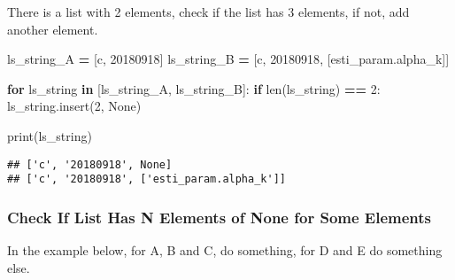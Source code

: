 \documentclass[
]{book}
\newenvironment{Shaded}{\begin{snugshade}}{\end{snugshade}}
\newcommand{\BuiltInTok}[1]{#1}
\newcommand{\ControlFlowTok}[1]{\textcolor[rgb]{0.13,0.29,0.53}{\textbf{#1}}}
\newcommand{\DecValTok}[1]{\textcolor[rgb]{0.00,0.00,0.81}{#1}}
\newcommand{\KeywordTok}[1]{\textcolor[rgb]{0.13,0.29,0.53}{\textbf{#1}}}
\newcommand{\NormalTok}[1]{#1}
\newcommand{\OperatorTok}[1]{\textcolor[rgb]{0.81,0.36,0.00}{\textbf{#1}}}
\newcommand{\StringTok}[1]{\textcolor[rgb]{0.31,0.60,0.02}{#1}}
\newcommand{\VariableTok}[1]{\textcolor[rgb]{0.00,0.00,0.00}{#1}}
\begin{document}
There is a list with 2 elements, check if the list has 3 elements, if not, add another element.

\begin{Shaded}
\begin{Highlighting}[]
\NormalTok{ls\_string\_A }\OperatorTok{=}\NormalTok{ [}\StringTok{\textquotesingle{}c\textquotesingle{}}\NormalTok{, }\StringTok{\textquotesingle{}20180918\textquotesingle{}}\NormalTok{]}
\NormalTok{ls\_string\_B }\OperatorTok{=}\NormalTok{ [}\StringTok{\textquotesingle{}c\textquotesingle{}}\NormalTok{, }\StringTok{\textquotesingle{}20180918\textquotesingle{}}\NormalTok{, [}\StringTok{\textquotesingle{}esti\_param.alpha\_k\textquotesingle{}}\NormalTok{]]}

\ControlFlowTok{for}\NormalTok{ ls\_string }\KeywordTok{in}\NormalTok{ [ls\_string\_A, ls\_string\_B]:}
  \ControlFlowTok{if} \BuiltInTok{len}\NormalTok{(ls\_string) }\OperatorTok{==} \DecValTok{2}\NormalTok{:}
\NormalTok{    ls\_string.insert(}\DecValTok{2}\NormalTok{, }\VariableTok{None}\NormalTok{)}
    
  \BuiltInTok{print}\NormalTok{(ls\_string)}
  
\end{Highlighting}
\end{Shaded}

\begin{verbatim}
## ['c', '20180918', None]
## ['c', '20180918', ['esti_param.alpha_k']]
\end{verbatim}

\hypertarget{check-if-list-has-n-elements-of-none-for-some-elements}{%
\subsubsection{Check If List Has N Elements of None for Some Elements}\label{check-if-list-has-n-elements-of-none-for-some-elements}}

In the example below, for A, B and C, do something, for D and E do something else.
\end{document}
